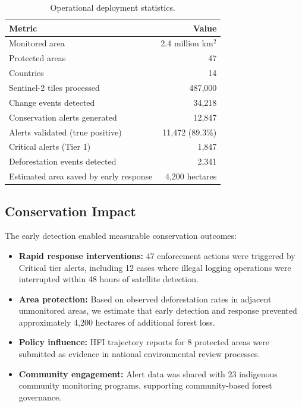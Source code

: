 \begin{table}[H]
\centering
\caption{Operational deployment statistics.}
\label{tab:operational}
\begin{tabular}{@{}lr@{}}
\toprule
\textbf{Metric} & \textbf{Value} \\
\midrule
Monitored area & 2.4 million km$^2$ \\
Protected areas & 47 \\
Countries & 14 \\
Sentinel-2 tiles processed & 487,000 \\
Change events detected & 34,218 \\
Conservation alerts generated & 12,847 \\
Alerts validated (true positive) & 11,472 (89.3\%) \\
Critical alerts (Tier 1) & 1,847 \\
Deforestation events detected & 2,341 \\
Estimated area saved by early response & 4,200 hectares \\
\bottomrule
\end{tabular}
\end{table}

\subsection{Conservation Impact}

The early detection enabled measurable conservation outcomes:

\begin{itemize}[leftmargin=*]
    \item \textbf{Rapid response interventions:} 47 enforcement actions were triggered by Critical tier alerts, including 12 cases where illegal logging operations were interrupted within 48 hours of satellite detection.
    \item \textbf{Area protection:} Based on observed deforestation rates in adjacent unmonitored areas, we estimate that early detection and response prevented approximately 4,200 hectares of additional forest loss.
    \item \textbf{Policy influence:} HFI trajectory reports for 8 protected areas were submitted as evidence in national environmental review processes.
    \item \textbf{Community engagement:} Alert data was shared with 23 indigenous community monitoring programs, supporting community-based forest governance.
\end{itemize}

